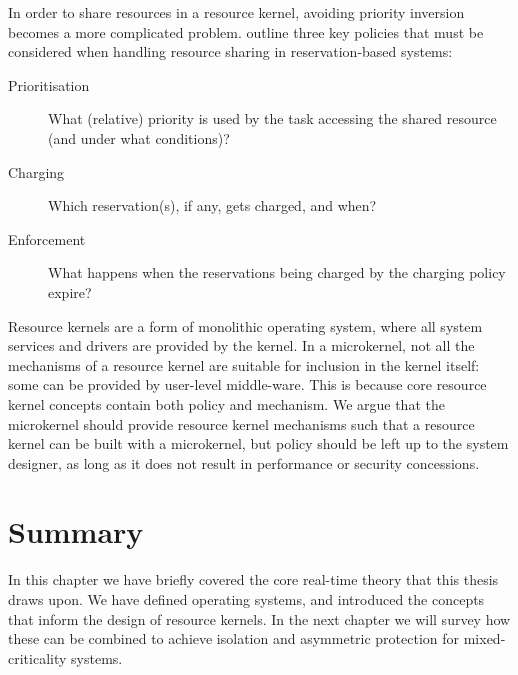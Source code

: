 \label{p:resource-kernel-resource-sharing}
In order to share resources in a resource kernel, avoiding priority inversion becomes a more
complicated problem.  \citet{deNiz_LSR_01} outline three key policies that must be considered when
handling resource sharing in reservation-based systems:

\begin{description}
    \item[Prioritisation] What (relative) priority is used by the task accessing the shared resource (and under what conditions)?
    \item[Charging] Which reservation(s), if any, gets charged, and when?
    \item[Enforcement] What happens when the reservations being charged by the charging policy expire?
\end{description}

Resource kernels are a form of monolithic operating system, where all system services and drivers
are provided by the kernel.  In a microkernel, not all the mechanisms of a resource kernel are
suitable for inclusion in the kernel itself: some can be provided by user-level middle-ware.  This
is because core resource kernel concepts contain both policy and mechanism.  We argue that the
microkernel should provide resource kernel mechanisms such that a resource kernel can be built with
a microkernel, but policy should be left up to the system designer, as long as it does not result in
performance or security concessions.

\section{Summary}

In this chapter we have briefly covered the core real-time theory that this thesis draws upon.
We have defined operating systems, and introduced the concepts that inform the design of resource kernels.
In the next chapter we will survey how these can be combined to achieve isolation and asymmetric protection for mixed-criticality systems.
